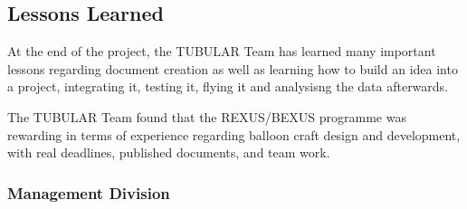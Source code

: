 \pagebreak
\subsection{Lessons Learned}
At the end of the project, the TUBULAR Team has learned many important lessons regarding document creation as well as learning how to build an idea into a project, integrating it, testing it, flying it and analysisng the data afterwards. \par
The TUBULAR Team found that the REXUS/BEXUS programme was rewarding in terms of experience regarding balloon craft design and development, with real deadlines, published documents, and team work. 

\subsubsection{Management Division}

